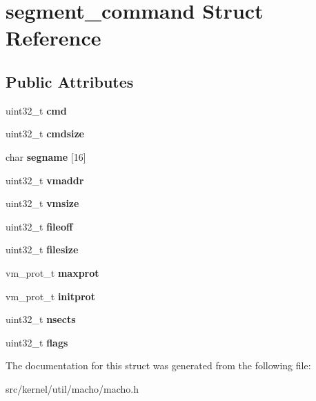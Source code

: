 \hypertarget{structsegment__command}{}\section{segment\+\_\+command Struct Reference}
\label{structsegment__command}
\subsection*{Public Attributes}
\begin{DoxyCompactItemize}
\item 
\mbox{\label{structsegment__command_af8df4184404debfbdf11899ce4877918}} 
uint32\+\_\+t {\bfseries cmd}
\item 
\mbox{\label{structsegment__command_a54f41d1ce2e176ab27e96dd4f2135f0b}} 
uint32\+\_\+t {\bfseries cmdsize}
\item 
\mbox{\label{structsegment__command_ac150caae0e2247d06fcd2eafaf07b4d1}} 
char {\bfseries segname} \mbox{[}16\mbox{]}
\item 
\mbox{\label{structsegment__command_aec80f7089732db695f9e77fd4c75be77}} 
uint32\+\_\+t {\bfseries vmaddr}
\item 
\mbox{\label{structsegment__command_a9d710cf0cd72090a045d6728697d95b9}} 
uint32\+\_\+t {\bfseries vmsize}
\item 
\mbox{\label{structsegment__command_a9db4dca6ffac1edc03b5574a0284ab27}} 
uint32\+\_\+t {\bfseries fileoff}
\item 
\mbox{\label{structsegment__command_acb24fbd6c6ec2b7d5c21a8029c879bf3}} 
uint32\+\_\+t {\bfseries filesize}
\item 
\mbox{\label{structsegment__command_a41af990f17cbd850cf978380b7105470}} 
vm\+\_\+prot\+\_\+t {\bfseries maxprot}
\item 
\mbox{\label{structsegment__command_a347993af7c29c07eeed2108a1a3ebc9a}} 
vm\+\_\+prot\+\_\+t {\bfseries initprot}
\item 
\mbox{\label{structsegment__command_ada908ddace3a40ab65e0d61ebfca6a2a}} 
uint32\+\_\+t {\bfseries nsects}
\item 
\mbox{\label{structsegment__command_a06c689b0fc19c610c36af15c45466fe1}} 
uint32\+\_\+t {\bfseries flags}
\end{DoxyCompactItemize}


The documentation for this struct was generated from the following file\+:\begin{DoxyCompactItemize}
\item 
src/kernel/util/macho/macho.\+h\end{DoxyCompactItemize}
